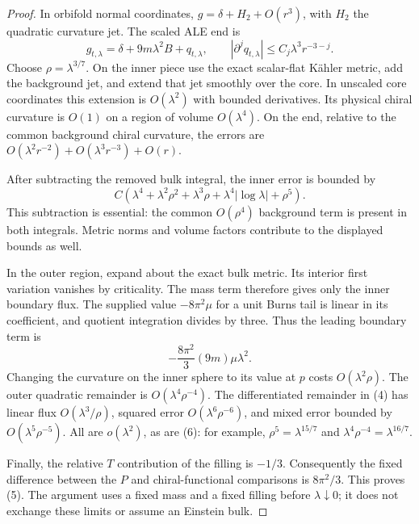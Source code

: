 \documentclass[11pt]{article}
\begin{document}
\begin{proof}
In orbifold normal coordinates, $g=\delta+H_2+O(r^3)$, with $H_2$
the quadratic curvature jet. The scaled ALE end is
\[
 g_{t,\lambda}=\delta+9m\lambda^2B+q_{t,\lambda},\qquad
 |\partial^j q_{t,\lambda}|\le C_j\lambda^3r^{-3-j}.
\]
Choose $\rho=\lambda^{3/7}$. On the inner piece use the exact
scalar-flat K\"ahler metric, add the background jet, and extend
that jet smoothly over the core. In unscaled core coordinates this
extension is $O(\lambda^2)$ with bounded derivatives. Its physical
chiral curvature is $O(1)$ on a region of volume $O(\lambda^4)$.
On the end, relative to the common background chiral curvature,
the errors are $O(\lambda^2r^{-2})+O(\lambda^3r^{-3})+O(r)$.

After subtracting the removed bulk integral, the inner error is bounded by
\[
 C\left(\lambda^4+\lambda^2\rho^2+\lambda^3\rho
            +\lambda^4|\log\lambda|+\rho^5\right).
 \tag{6}
\]
This subtraction is essential: the common $O(\rho^4)$ background
term is present in both integrals. Metric norms and volume factors
contribute to the displayed bounds as well.

In the outer region, expand about the exact bulk metric. Its interior
first variation vanishes by criticality. The mass term therefore gives
only the inner boundary flux. The supplied value $-8\pi^2\mu$ for
a unit Burns tail is linear in its coefficient, and quotient integration
divides by three. Thus the leading boundary term is
\[
 -\frac{8\pi^2}{3}(9m)\mu\lambda^2.
\]
Changing the curvature on the inner sphere to its value at $p$ costs
$O(\lambda^2\rho)$. The outer quadratic remainder is
$O(\lambda^4\rho^{-4})$. The differentiated remainder in (4)
has linear flux $O(\lambda^3/\rho)$, squared error
$O(\lambda^6\rho^{-6})$, and mixed error bounded by
$O(\lambda^5\rho^{-5})$. All are $o(\lambda^2)$, as are (6):
for example, $\rho^5=\lambda^{15/7}$ and
$\lambda^4\rho^{-4}=\lambda^{16/7}$.

Finally, the relative $T$ contribution of the filling is $-1/3$.
Consequently the fixed difference between the $P$ and chiral-functional
comparisons is $8\pi^2/3$. This proves (5). The argument uses a fixed
mass and a fixed filling before $\lambda\downarrow0$; it does not
exchange these limits or assume an Einstein bulk.
\end{proof}
\end{document}
